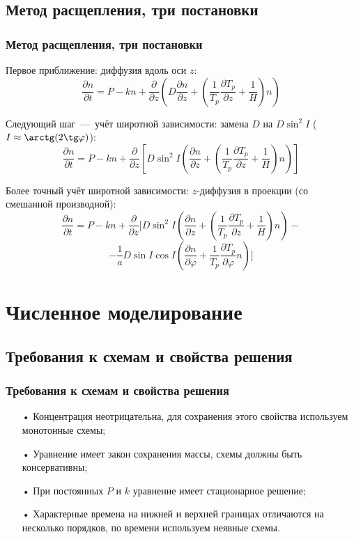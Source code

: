 \documentclass[9pt, apectratio=43,unicode]{beamer}
\begin{document}
\subsection{Метод расщепления, три постановки}
\begin{frame}\frametitle{Метод расщепления, три постановки}

Первое приближение: диффузия вдоль оси $z$:
$$\dfrac{\partial n}{\partial t} = P-kn+\dfrac{\partial}{\partial z}\left(D\dfrac{\partial n}{\partial z} + \left(\dfrac{1}{T_p}\dfrac{\partial T_p}{\partial z}+\dfrac{1}{H}\right) n\right)$$

Следующий шаг~---~учёт широтной зависимости: замена $D$ на $D\sin^2I$ ($I \approx \arctg(2\tg \varphi)$):
$$\dfrac{\partial n}{\partial t} =P-kn+\dfrac{\partial}{\partial z}\left[D\sin^2I\left(\dfrac{\partial n}{\partial z} + \left(\dfrac{1}{T_p}\dfrac{\partial T_p}{\partial z}+\dfrac{1}{H}\right) n\right)\right]$$

Более точный учёт широтной зависимости: $z$-диффузия в проекции (со смешанной производной):
$$\dfrac{\partial n}{\partial t} =P-kn+\dfrac{\partial}{\partial z}\biggl[D\sin^2 I\left(\dfrac{\partial n}{\partial z}+\left(\dfrac{1}{T_p}\dfrac{\partial T_p}{\partial z}+\dfrac{1}{H}\right)n\right)-$$ $$-\dfrac{1}{a}D\sin I\cos I\left(\dfrac{\partial n}{\partial\varphi}+\dfrac{1}{T_p}\dfrac{\partial T_p}{\partial\varphi}n\right)\biggr]$$ 

\end{frame}


\section{Численное моделирование}
\subsection{Требования к схемам и свойства решения}
\begin{frame}\frametitle{Требования к схемам и свойства решения}

\begin{itemize}
\item[•] Концентрация неотрицательна, для сохранения этого свойства используем монотонные схемы;
\item[•] Уравнение имеет закон сохранения массы, схемы должны быть консервативны;
\item[•] При постоянных $P$ и $k$ уравнение имеет стационарное решение;
\item[•] Характерные времена на нижней и верхней границах отличаются на несколько порядков, по времени используем неявные схемы.
\end{itemize}

\end{frame}
\end{document}
